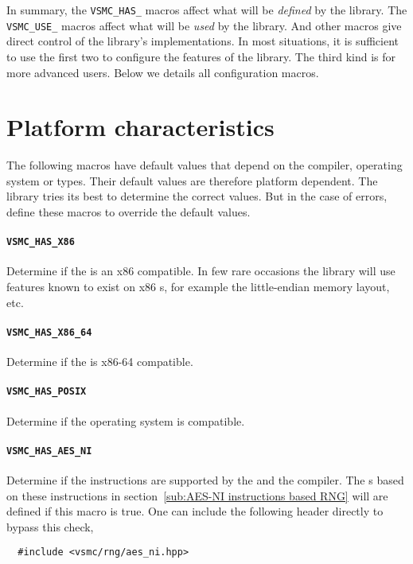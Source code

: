 In summary, the \verb|VSMC_HAS_| macros affect what will be \emph{defined} by
the library. The \verb|VSMC_USE_| macros affect what will be \emph{used} by the
library. And other macros give direct control of the library's implementations.
In most situations, it is sufficient to use the first two to configure the
features of the library. The third kind is for more advanced users. Below we
details all configuration macros.

\section{Platform characteristics}
\label{sec:Platform characteristics}

The following macros have default values that depend on the compiler, operating
system or \cpu types. Their default values are therefore platform dependent.
The library tries its best to determine the correct values. But in the case of
errors, define these macros to override the default values.

\paragraph{\texttt{VSMC\_HAS\_X86}} Determine if the \cpu is an x86 compatible.
In few rare occasions the library will use features known to exist on x86
\cpu{}s, for example the little-endian memory layout, etc.

\paragraph{\texttt{VSMC\_HAS\_X86\_64}} Determine if the \cpu is x86-64
compatible.

\paragraph{\texttt{VSMC\_HAS\_POSIX}} Determine if the operating system is
\posix compatible.

\paragraph{\texttt{VSMC\_HAS\_AES\_NI}} Determine if the \aesni instructions
are supported by the \cpu and the compiler. The \rng{}s based on these
instructions in section~\ref{sub:AES-NI instructions based RNG} will are
defined if this macro is true. One can include the following header directly to
bypass this check,
\begin{Verbatim}
  #include <vsmc/rng/aes_ni.hpp>
\end{Verbatim}

